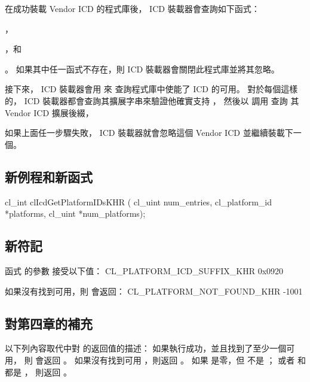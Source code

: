 在成功裝載 Vendor ICD 的程式庫後，
 ICD 裝載器會查詢如下函式：
\startigBase[indentnext=no]
\item {}，
\item {}，和
\item {}。
\stopigBase
如果其中任一函式不存在，則 ICD 裝載器會關閉此程式庫並將其忽略。

接下來， ICD 裝載器會用  來
查詢程式庫中使能了 ICD 的可用。
對於每個這樣的，
 ICD 裝載器都會查詢其擴展字串來驗證他確實支持 ，
然後以  調用  查詢
其 Vendor ICD 擴展後綴，

如果上面任一步驟失敗， ICD 裝載器就會忽略這個 Vendor ICD 並繼續裝載下一個。

\subsection{新例程和新函式}

\startCLFUNC
cl_int clIcdGetPlatformIDsKHR (
			cl_uint num_entries,
			cl_platform_id *platforms,
			cl_uint *num_platforms);
\stopCLFUNC

\subsection{新符記}

函式  的參數  接受以下值：
\startclc
CL_PLATFORM_ICD_SUFFIX_KHR	0x0920
\stopclc

如果沒有找到可用，則  會返回：
\startclc
CL_PLATFORM_NOT_FOUND_KHR	-1001
\stopclc

\subsection{對第四章的補充}

以下列內容取代中對  的返回值的描述：
\startreplacepar
如果執行成功，並且找到了至少一個可用，
則  會返回 。
如果沒有找到可用 ，則返回 。
如果  是零，但  不是 ；
或者  和  都是 ，
則返回 。
\stopreplacepar

